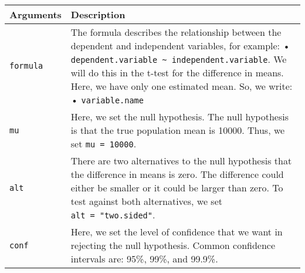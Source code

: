 \documentclass[]{article}
\begin{document}
\begin{longtable}[]{@{}ll@{}}
\toprule
\begin{minipage}[b]{0.14\columnwidth}\raggedright
Arguments\strut
\end{minipage} & \begin{minipage}[b]{0.80\columnwidth}\raggedright
Description\strut
\end{minipage}\tabularnewline
\midrule
\endhead
\begin{minipage}[t]{0.14\columnwidth}\raggedright
\texttt{formula}\strut
\end{minipage} & \begin{minipage}[t]{0.80\columnwidth}\raggedright
The formula describes the relationship between the dependent and independent variables, for example: • \texttt{dependent.variable\ \textasciitilde{}\ independent.variable}. We will do this in the t-test for the difference in means. Here, we have only one estimated mean. So, we write: • \texttt{variable.name}\strut
\end{minipage}\tabularnewline
\begin{minipage}[t]{0.14\columnwidth}\raggedright
\texttt{mu}\strut
\end{minipage} & \begin{minipage}[t]{0.80\columnwidth}\raggedright
Here, we set the null hypothesis. The null hypothesis is that the true population mean is 10000. Thus, we set \texttt{mu\ =\ 10000}.\strut
\end{minipage}\tabularnewline
\begin{minipage}[t]{0.14\columnwidth}\raggedright
\texttt{alt}\strut
\end{minipage} & \begin{minipage}[t]{0.80\columnwidth}\raggedright
There are two alternatives to the null hypothesis that the difference in means is zero. The difference could either be smaller or it could be larger than zero. To test against both alternatives, we set \texttt{alt\ =\ "two.sided"}.\strut
\end{minipage}\tabularnewline
\begin{minipage}[t]{0.14\columnwidth}\raggedright
\texttt{conf}\strut
\end{minipage} & \begin{minipage}[t]{0.80\columnwidth}\raggedright
Here, we set the level of confidence that we want in rejecting the null hypothesis. Common confidence intervals are: 95\%, 99\%, and 99.9\%.\strut
\end{minipage}\tabularnewline
\bottomrule
\end{longtable}
\end{document}
